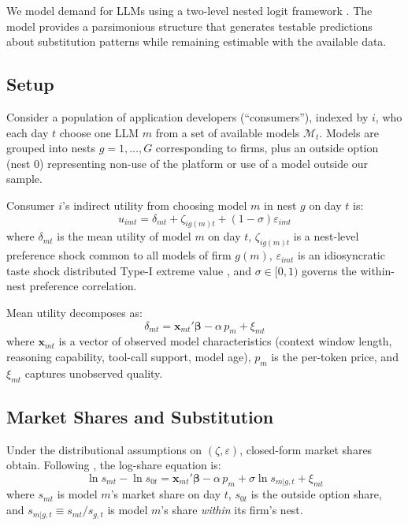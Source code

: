 \documentclass[11pt, a4paper]{article}
\begin{document}
We model demand for LLMs using a two-level nested logit framework \citep{berry1994estimating, mcfadden1978modelling}. The model provides a parsimonious structure that generates testable predictions about substitution patterns while remaining estimable with the available data.

\subsection{Setup}

Consider a population of application developers (``consumers''), indexed by $i$, who each day $t$ choose one LLM $m$ from a set of available models $\mathcal{M}_t$. Models are grouped into nests $g = 1, \ldots, G$ corresponding to firms, plus an outside option (nest 0) representing non-use of the platform or use of a model outside our sample.

Consumer $i$'s indirect utility from choosing model $m$ in nest $g$ on day $t$ is:
\begin{equation}
u_{imt} = \delta_{mt} + \zeta_{ig(m)t} + (1 - \sigma)\varepsilon_{imt}
\label{eq:utility}
\end{equation}
where $\delta_{mt}$ is the mean utility of model $m$ on day $t$, $\zeta_{ig(m)t}$ is a nest-level preference shock common to all models of firm $g(m)$, $\varepsilon_{imt}$ is an idiosyncratic taste shock distributed Type-I extreme value \citep{cardell1997variance}, and $\sigma \in [0, 1)$ governs the within-nest preference correlation.

Mean utility decomposes as:
\begin{equation}
\delta_{mt} = \mathbf{x}_{mt}'\boldsymbol{\beta} - \alpha \, p_m + \xi_{mt}
\label{eq:meanutil}
\end{equation}
where $\mathbf{x}_{mt}$ is a vector of observed model characteristics (context window length, reasoning capability, tool-call support, model age), $p_m$ is the per-token price, and $\xi_{mt}$ captures unobserved quality.

\subsection{Market Shares and Substitution}

Under the distributional assumptions on $(\zeta, \varepsilon)$, closed-form market shares obtain. Following \citet{berry1994estimating}, the log-share equation is:
\begin{equation}
\ln s_{mt} - \ln s_{0t} = \mathbf{x}_{mt}'\boldsymbol{\beta} - \alpha \, p_m + \sigma \ln s_{m|g,t} + \xi_{mt}
\label{eq:berry}
\end{equation}
where $s_{mt}$ is model $m$'s market share on day $t$, $s_{0t}$ is the outside option share, and $s_{m|g,t} \equiv s_{mt} / s_{g,t}$ is model $m$'s share \emph{within} its firm's nest.
\end{document}
